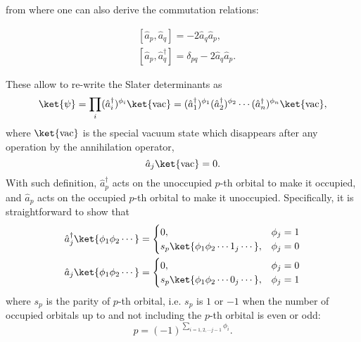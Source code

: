from where one can also derive the commutation relations:

\begin{equation}
\begin{aligned}
&\left[\hat{a}_p, \hat{a}_q \right] = -2\hat{a}_q\hat{a}_p, \\
&\left[\hat{a}_p, \hat{a}_q^{\dagger} \right] = \delta_{pq} - 2\hat{a}_q\hat{a}_p.
\end{aligned}
\end{equation}

These allow to re-write the Slater determinants as
\begin{equation}
    \ket{\psi} = \prod_i (\hat{a}_i^\dagger)^{\phi_i} \ket{\mathrm{vac}} 
    = (\hat{a}_1^\dagger)^{\phi_1} (\hat{a}_2^\dagger)^{\phi_2} \cdots (\hat{a}_n^\dagger)^{\phi_n} \ket{\mathrm{vac}},
\end{equation}
where $\ket{\mathrm{vac}}$ is the special vacuum state which disappears after any operation by the annihilation operator, 
\begin{equation}
    \hat{a}_j\ket{\mathrm{vac}}=0.
\end{equation}
With such definition, $\hat{a}_{p}^{\dagger}$ acts on the unoccupied $p$-th orbital to make it occupied, and $\hat{a}_{p}$ acts on the occupied $p$-th orbital to make it unoccupied. Specifically, it is straightforward to show that
\begin{equation} \label{eq:JWladder}
\begin{split}
    \hat{a}_{j}^{\dagger }\ket{\phi_{1} \phi_{2} \cdots } & =\begin{cases}
    0 , &\phi_{j} =1\\
    s_p \ket{\phi_1\phi_2\cdots 1_j \cdots} , &\phi_{j} =0
    \end{cases}\\
    \hat{a}_{j}\ket{\phi_{1} \phi_{2} \cdots } & =\begin{cases}
    0 , &\phi_{j} =0\\
    s_p \ket{\phi_1 \phi_2 \cdots 0_j \cdots}, &\phi_{j} =1
    \end{cases}
\end{split}
\end{equation}
where $s_p$ is the parity of $p$-th orbital, i.e. $s_p$ is $1$ or $-1$ when the number of occupied orbitals up to and not including the $p$-th orbital is even or odd:
\begin{equation}
    p = ( -1)^{\sum _{i=1,2,\cdots j-1} \phi_{i}}.
\end{equation}

